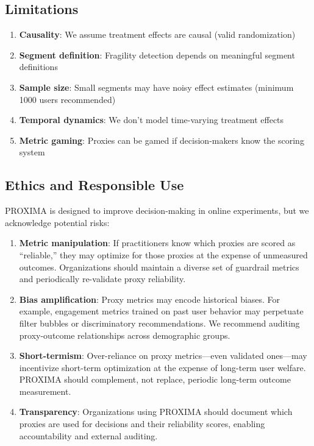 \documentclass[11pt,twocolumn]{article}
\begin{document}
\subsection{Limitations}

\begin{enumerate}
    \item \textbf{Causality}: We assume treatment effects are causal (valid randomization)
    \item \textbf{Segment definition}: Fragility detection depends on meaningful segment definitions
    \item \textbf{Sample size}: Small segments may have noisy effect estimates (minimum 1000 users recommended)
    \item \textbf{Temporal dynamics}: We don't model time-varying treatment effects
    \item \textbf{Metric gaming}: Proxies can be gamed if decision-makers know the scoring system
\end{enumerate}

\subsection{Ethics and Responsible Use}

PROXIMA is designed to improve decision-making in online experiments, but we acknowledge potential risks:

\begin{enumerate}
    \item \textbf{Metric manipulation}: If practitioners know which proxies are scored as ``reliable,'' they may optimize for those proxies at the expense of unmeasured outcomes. Organizations should maintain a diverse set of guardrail metrics and periodically re-validate proxy reliability.

    \item \textbf{Bias amplification}: Proxy metrics may encode historical biases. For example, engagement metrics trained on past user behavior may perpetuate filter bubbles or discriminatory recommendations. We recommend auditing proxy-outcome relationships across demographic groups.

    \item \textbf{Short-termism}: Over-reliance on proxy metrics—even validated ones—may incentivize short-term optimization at the expense of long-term user welfare. PROXIMA should complement, not replace, periodic long-term outcome measurement.

    \item \textbf{Transparency}: Organizations using PROXIMA should document which proxies are used for decisions and their reliability scores, enabling accountability and external auditing.
\end{enumerate}
\end{document}

